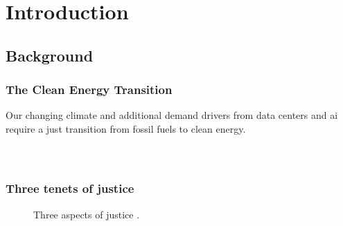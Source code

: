 \section{Introduction}

\subsection{Background}

\begin{frame}
    \frametitle{The Clean Energy Transition}
    Our changing climate and additional demand drivers from data 
    centers and \gls{ai} require a just transition from fossil 
    fuels to clean energy.
    \begin{columns}
        \column[t]{5.5cm}    
        \begin{figure}
            \centering
            \resizebox{\columnwidth}{!}{}
        \end{figure}
        \column[t]{5.25cm}    
        \begin{figure}
            \centering
            \resizebox{\columnwidth}{!}{}
        \end{figure}
    \end{columns}
\end{frame}

\begin{frame}
    \frametitle{Three tenets of justice}
    \begin{figure}
        \centering

        \caption{Three aspects of justice \cite{schlosberg_1_2007}.}
    \end{figure}
\end{frame}

